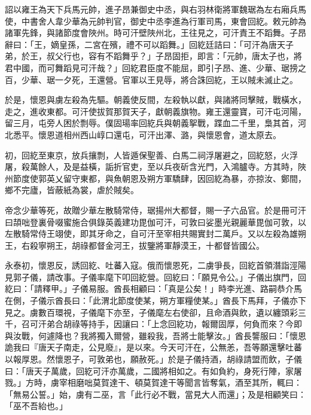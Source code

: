 \begin{pinyinscope}
 詔以雍王為天下兵馬元帥，進子昂兼御史中丞，與右羽林衛將軍魏琚為左右廂兵馬使，中書舍人韋少華為元帥判官，御史中丞李進為行軍司馬，東會回紇。敕元帥為諸軍先鋒，與諸節度會陜州。時可汗壁陜州北，王往見之，可汗責王不蹈舞。子昂辭曰：「王，嫡皇孫，二宮在殯，禮不可以蹈舞。」回紇廷詰曰：「可汗為唐天子弟，於王，叔父行也，容有不蹈舞乎？」子昂固拒，即言：「元帥，唐太子也，將君中國，而可舞蹈見可汗哉？」回紇君臣度不能屈，即引子昂、進、少華、琚搒之百，少華、琚一夕死，王還營。官軍以王見辱，將合誅回紇，王以賊未滅止之。



 於是，懷恩與虜左殺為先驅。朝義使反間，左殺執以獻，與諸將同擊賊，戰橫水，走之，進收東都。可汗使拔賀那賀天子，獻朝義旗物。雍王還靈寶，可汗屯河陽，留三月，屯旁人困於剽辱。僕固瑒率回紇兵與朝義挐戰，蹀血二千里，梟其首，河北悉平。懷恩道相州西山崞口還屯，可汗出澤、潞，與懷恩會，道太原去。



 初，回紇至東京，放兵攘剽，人皆遁保聖善、白馬二祠浮屠避之，回紇怒，火浮屠，殺萬餘人，及是益橫，詬折官吏，至以兵夜斫含光門，入鴻臚寺。方其時，陜州節度使郭英乂留守東都，與魚朝恩及朔方軍驕肆，因回紇為暴，亦掠汝、鄭間，鄉不完廬，皆蔽紙為裳，虐於賊矣。



 帝念少華等死，故贈少華左散騎常侍，琚揚州大都督，賜一子六品官。於是冊可汗曰頡咄登裏骨啜蜜施合俱錄英義建功毘伽可汗，可敦曰娑墨光親麗華毘伽可敦，以左散騎常侍王翊使，即其牙命之，自可汗至宰相共賜實封二萬戶。又以左殺為雄朔王，右殺寧朔王，胡祿都督金河王，拔鑒將軍靜漠王，十都督皆國公。



 永泰初，懷恩反，誘回紇、吐蕃入寇。俄而懷恩死，二虜爭長，回紇首領潛詣涇陽見郭子儀，請改事。子儀率麾下叩回紇營。回紇曰：「願見令公。」子儀出旗門，回紇曰：「請釋甲。」子儀易服。酋長相顧曰：「真是公矣！」時李光進、路嗣恭介馬在側，子儀示酋長曰：「此渭北節度使某，朔方軍糧使某。」酋長下馬拜，子儀亦下見之。虜數百環視，子儀麾下亦至，子儀麾左右使卻，且命酒與飲，遺以纏頭彩三千，召可汗弟合胡祿等持手，因讓曰：「上念回紇功，報爾固厚，何負而來？今即與汝戰，何遽降也？我將獨入爾營，雖殺我，吾將士能擊汝。」酋長讋服曰：「懷恩詭我曰『唐天子南走，公見廢』，是以來。今天可汗在，公無恙，吾等願還擊吐蕃以報厚恩。然懷恩子，可敦弟也，願赦死。」於是子儀持酒，胡祿請盟而飲，子儀曰：「唐天子萬歲，回紇可汗亦萬歲，二國將相如之。有如負約，身死行陣，家屠戮。」方時，虜宰相磨咄莫賀達干、頓莫賀達干等聞言皆奪氣，酒至其所，輒曰：「無易公誓。」始，虜有二巫，言「此行必不戰，當見大人而還」；及是相顧笑曰：「巫不吾紿也。」




\end{pinyinscope}
